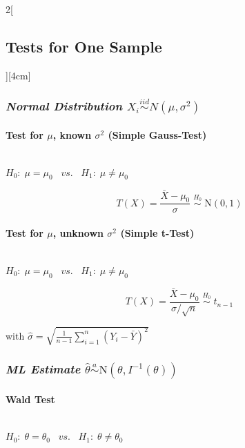 \documentclass[8pt]{extarticle}
\begin{document}
\begin{multicols}{2}[\subsection{Tests for One Sample}][4cm]

\subsubsection*{\textit{Normal Distribution $X_i \overset{iid}{\sim} N(\mu,\sigma^2)$}}

  \paragraph{Test for $\mu$, known $\sigma^2 $ (Simple Gauss-Test)} \ \\
  
  \noindent $H_0\!:\; \mu = \mu_0 \;\;\; vs. \;\;\; H_1\!:\; \mu \neq \mu_0$
  
  $$T(X) = \frac{\bar{X} -\mu_0}{\sigma} \;\overset{H_0}{\sim} \;\mathrm{N}(0,1)$$
  
  
  
  \paragraph{Test for $\mu$, unknown $\sigma^2 $ (Simple t-Test)} \ \\
  
  \noindent $H_0\!:\; \mu = \mu_0 \;\;\; vs. \;\;\; H_1\!:\; \mu \neq \mu_0$
  
  $$T(X) = \frac{\bar{X} -\mu_0}{\hat{\sigma}/\sqrt{n}} \;\overset{H_0}{\sim}\; t_{n-1}$$
  
  \noindent with $\hat{\sigma} = \sqrt{\frac{1}{n-1} \sum_{i=1}^n(Y_i - \bar{Y})^2}$
  
\subsubsection*{\textit{ML Estimate $\hat{\theta} \overset{a}{\sim} \mathrm{N}(\theta, I^{-1}(\theta))$}}
  
  \paragraph{Wald Test} \ \\
  
  \noindent $H_0\!:\; \theta = \theta_0 \;\;\; vs. \;\;\; H_1\!:\; \theta \neq \theta_0$
  

\end{multicols}
\end{document}
